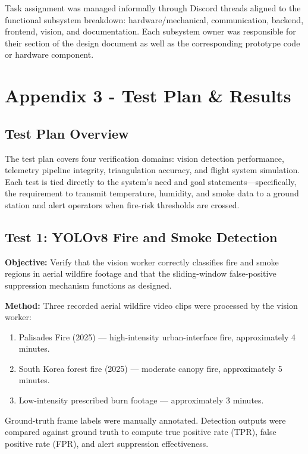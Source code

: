 \documentclass[journal, onecolumn]{IEEEtran}
\begin{document}
Task assignment was managed informally through Discord threads aligned to the functional subsystem breakdown: hardware/mechanical, communication, backend, frontend, vision, and documentation. Each subsystem owner was responsible for their section of the design document as well as the corresponding prototype code or hardware component.

\section{Appendix 3 - Test Plan \& Results}

\subsection{Test Plan Overview}

The test plan covers four verification domains: vision detection performance, telemetry pipeline integrity, triangulation accuracy, and flight system simulation. Each test is tied directly to the system's need and goal statements—specifically, the requirement to transmit temperature, humidity, and smoke data to a ground station and alert operators when fire-risk thresholds are crossed.

\subsection{Test 1: YOLOv8 Fire and Smoke Detection}

\textbf{Objective:} Verify that the vision worker correctly classifies fire and smoke regions in aerial wildfire footage and that the sliding-window false-positive suppression mechanism functions as designed.

\textbf{Method:} Three recorded aerial wildfire video clips were processed by the vision worker:
\begin{enumerate}
    \item Palisades Fire (2025) — high-intensity urban-interface fire, approximately 4 minutes.
    \item South Korea forest fire (2025) — moderate canopy fire, approximately 5 minutes.
    \item Low-intensity prescribed burn footage — approximately 3 minutes.
\end{enumerate}
Ground-truth frame labels were manually annotated. Detection outputs were compared against ground truth to compute true positive rate (TPR), false positive rate (FPR), and alert suppression effectiveness.
\end{document}
